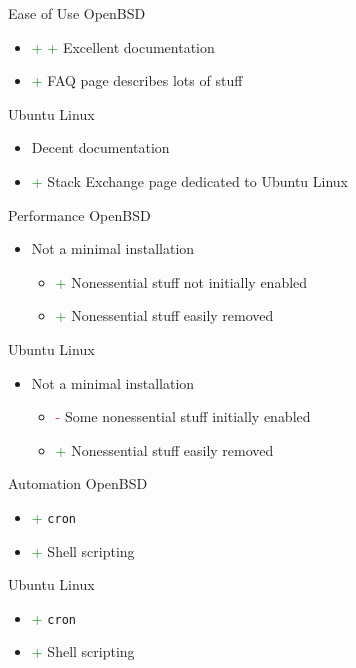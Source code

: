 \documentclass{beamer}
\newcommand{\good}{\textcolor{green}{+ }}
\newcommand{\bad}{\textcolor{red}{- }}
\begin{document}
			\begin{frame}{Ease of Use}
				OpenBSD
				\begin{itemize}
					\item \good \good Excellent documentation
					\item \good FAQ page describes lots of stuff
				\end{itemize}
				Ubuntu Linux
				\begin{itemize}
					\item Decent documentation
					\item \good Stack Exchange page dedicated to Ubuntu Linux
				\end{itemize}
			\end{frame}
			\begin{frame}{Performance}
				OpenBSD
				\begin{itemize}
					\item Not a minimal installation
					\begin{itemize}
						\item \good Nonessential stuff not initially enabled
						\item \good Nonessential stuff easily removed
					\end{itemize}
				\end{itemize}
				Ubuntu Linux
				\begin{itemize}
					\item Not a minimal installation
					\begin{itemize}
						\item \bad Some nonessential stuff initially enabled
						\item \good Nonessential stuff easily removed
					\end{itemize}
				\end{itemize}
			\end{frame}
			\begin{frame}{Automation}
				OpenBSD
				\begin{itemize}
					\item \good \texttt{cron}
					\item \good Shell scripting
				\end{itemize}
				Ubuntu Linux
				\begin{itemize}
					\item \good \texttt{cron}
					\item \good Shell scripting
				\end{itemize}
			\end{frame}
\end{document}
